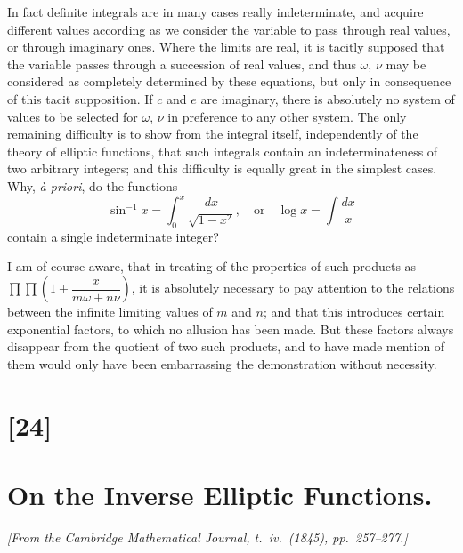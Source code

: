 \documentclass[12pt,a4paper]{article}
\begin{document}
In fact definite integrals are in many cases really indeterminate, and acquire different values according as we consider the variable to pass through real values, or through imaginary ones. Where the limits are real, it is tacitly supposed that the variable passes through a succession of real values, and thus $\omega$, $\nu$ may be considered as completely determined by these equations, but only in consequence of this tacit supposition. If $c$ and $e$ are imaginary, there is absolutely no system of values to be selected for $\omega$, $\nu$ in preference to any other system. The only remaining difficulty is to show from the integral itself, independently of the theory of elliptic functions, that such integrals contain an indeterminateness of two arbitrary integers; and this difficulty is equally great in the simplest cases. Why, \textit{\`a priori}, do the functions
\[
\sin^{-1} x = \int_0^x \frac{dx}{\sqrt{1-x^2}},\quad \text{or}\quad \log x = \int \frac{dx}{x}
\]
contain a single indeterminate integer?

I am of course aware, that in treating of the properties of such products as $\prod\!\!\prod\!\left(1 + \dfrac{x}{m\omega + n\nu}\right)$, it is absolutely necessary to pay attention to the relations between the infinite limiting values of $m$ and $n$; and that this introduces certain exponential factors, to which no allusion has been made. But these factors always disappear from the quotient of two such products, and to have made mention of them would only have been embarrassing the demonstration without necessity.

\newpage
\section*{[24]}
\section*{On the Inverse Elliptic Functions.}

\textit{[From the Cambridge Mathematical Journal, t.~iv.~(1845), pp.~257--277.]}

\bigskip
\setcounter{page}{136}
\end{document}
